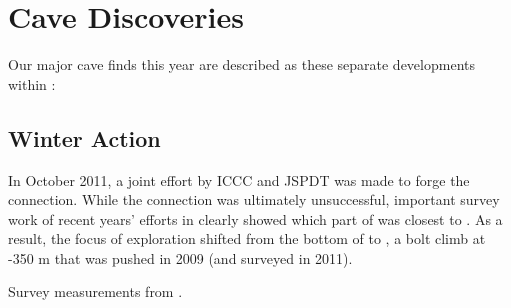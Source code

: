 
\section{Cave Discoveries}

Our major cave finds this year are described as these separate
developments within :


\subsection{Winter Action}

In October 2011, a joint effort by ICCC and JSPDT was made to forge the
connection. While the connection was ultimately unsuccessful, important
survey work of recent years' efforts in  clearly
showed which part of  was closest to . As a
result, the focus of exploration shifted from the bottom of  to
, a bolt climb at -350 m that was pushed in 2009 (and surveyed in 2011).


\begin{marginfigure}
\checkoddpage \ifoddpage \forcerectofloat \else \forceversofloat \fi
\centering
 \caption{Survey measurements from .}
 \label{m2 napshiran rov survey}
\end{marginfigure}

